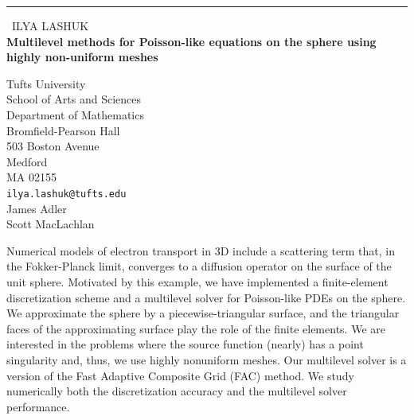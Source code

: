 \documentclass{report}
\begin{document}
\begin{center}
\rule{6in}{1pt} \
{\large ILYA LASHUK \\
{\bf Multilevel methods for Poisson-like equations on the sphere using highly non-uniform meshes}}

Tufts University \\ School of Arts and Sciences \\ Department of Mathematics \\ Bromfield-Pearson Hall \\ 503 Boston Avenue \\ Medford \\ MA 02155
\\
{\tt ilya.lashuk@tufts.edu}\\
James Adler\\
Scott MacLachlan\end{center}

Numerical models of electron transport in 3D include a scattering term
that, in the Fokker-Planck limit, converges to a diffusion operator on
the surface of the unit sphere. Motivated by this example, we have
implemented a finite-element discretization scheme and a multilevel
solver for Poisson-like PDEs on the sphere. We approximate the sphere by
a piecewise-triangular surface, and the triangular faces of the
approximating surface play the role of the finite elements. We are
interested in the problems where the source function (nearly) has a point
singularity and, thus, we use highly nonuniform meshes. Our multilevel
solver is a version of the Fast Adaptive Composite Grid (FAC) method. We
study numerically both the discretization accuracy and the multilevel
solver performance.
\end{document}

